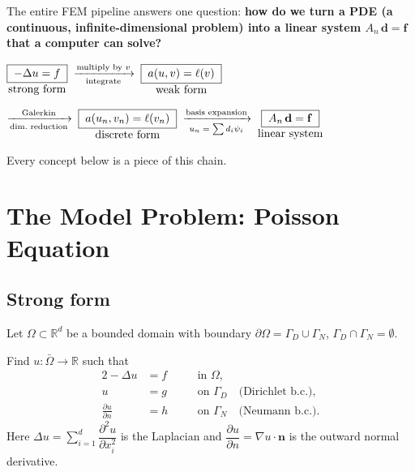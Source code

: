 \documentclass[11pt,a4paper]{article}
\theoremstyle{plain}
\theoremstyle{remark}
\newcommand{\R}{\mathbb{R}}
\newcommand{\pd}[2]{\frac{\partial #1}{\partial #2}}
\newcommand{\un}{u_n}
\newcommand{\vn}{v_n}
\let\origsubsection\subsection
\renewcommand{\subsection}{\needspace{6\baselineskip}\origsubsection}
\begin{document}
The entire FEM pipeline answers one question:
\textbf{how do we turn a PDE (a continuous, infinite-dimensional problem)
into a linear system $A_n\,\mathbf{d} = \mathbf{f}$ that a computer can
solve?}

\begin{keyidea}
\begin{center}
\small
$\displaystyle
  \underset{\text{\normalsize strong form}}{\boxed{\;-\Delta u = f\;}}
  \;\xrightarrow[\text{integrate}]{\text{multiply by }v}\;
  \underset{\text{\normalsize weak form}}{\boxed{\;a(u,v) = \ell(v)\;}}
$

\bigskip

$\displaystyle
  \xrightarrow[\text{dim.\ reduction}]{\text{Galerkin}}\;
  \underset{\text{\normalsize discrete form}}{\boxed{\;a(\un,\vn)=\ell(\vn)\;}}
  \;\xrightarrow[\text{$\un=\sum d_i\psi_i$}]{\text{basis expansion}}\;
  \underset{\text{\normalsize linear system}}{\boxed{\;A_n\,\mathbf{d}=\mathbf{f}\;}}
$
\end{center}
Every concept below is a piece of this chain.
\end{keyidea}

\newpage
\section{The Model Problem: Poisson Equation}
\label{sec:poisson}

\subsection{Strong form}

Let $\Omega \subset \R^d$ be a bounded domain with boundary
$\partial\Omega = \Gamma_D \cup \Gamma_N$, $\Gamma_D \cap \Gamma_N = \emptyset$.

\begin{definition}
Find $u : \bar{\Omega} \to \R$ such that
\begin{alignat}{2}
  -\Delta u &= f        &\quad& \text{in } \Omega,
    \label{eq:poisson}\\
         u  &= g        &\quad& \text{on } \Gamma_D
    \quad\text{(Dirichlet b.c.)}, \label{eq:dirichlet}\\
  \pd{u}{n} &= h        &\quad& \text{on } \Gamma_N
    \quad\text{(Neumann b.c.)}. \label{eq:neumann}
\end{alignat}
Here $\Delta u = \sum_{i=1}^{d}\dfrac{\partial^2 u}{\partial x_i^2}$
is the Laplacian and
$\dfrac{\partial u}{\partial n} = \nabla u \cdot \mathbf{n}$
is the outward normal derivative.
\end{definition}
\end{document}
